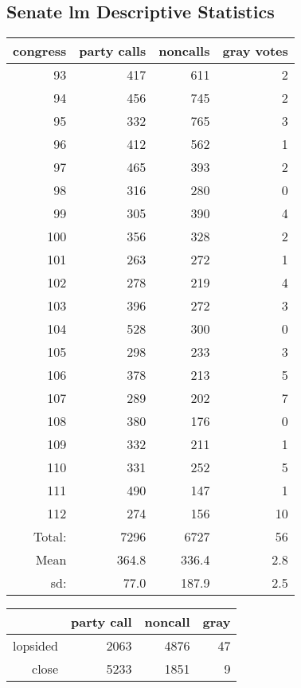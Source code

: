 \documentclass[12pt]{article}
\begin{document}
\subsection{Senate lm Descriptive Statistics}

\begin{table}[ht]
	\centering
	\begin{tabular}{rrrr}
		\hline
		congress & party calls & noncalls & gray votes \\ 
		\hline
		93 & 417 & 611 &   2 \\ 
		94 & 456 & 745 &   2 \\ 
		95 & 332 & 765 &   3 \\ 
		96 & 412 & 562 &   1 \\ 
		97 & 465 & 393 &   2 \\ 
		98 & 316 & 280 &   0 \\ 
		99 & 305 & 390 &   4 \\ 
		100 & 356 & 328 &   2 \\ 
		101 & 263 & 272 &   1 \\ 
		102 & 278 & 219 &   4 \\ 
		103 & 396 & 272 &   3 \\ 
		104 & 528 & 300 &   0 \\ 
		105 & 298 & 233 &   3 \\ 
		106 & 378 & 213 &   5 \\ 
		107 & 289 & 202 &   7 \\ 
		108 & 380 & 176 &   0 \\ 
		109 & 332 & 211 &   1 \\ 
		110 & 331 & 252 &   5 \\ 
		111 & 490 & 147 &   1 \\ 
		112 & 274 & 156 &  10 \\ 
		\hline
		Total: & 7296 & 6727 & 56 \\
		Mean & 364.8 & 336.4 & 2.8 \\
		sd: & 77.0 & 187.9 & 2.5 \\
		\hline
	\end{tabular}
\end{table}

\begin{table}[ht]
	\centering
	\begin{tabular}{rrrr}
		\hline
		& party call & noncall & gray \\ 
		\hline
		lopsided & 2063 & 4876 &  47 \\ 
		close & 5233 & 1851 &   9 \\ 
		\hline
	\end{tabular}
\end{table}
\end{document}
